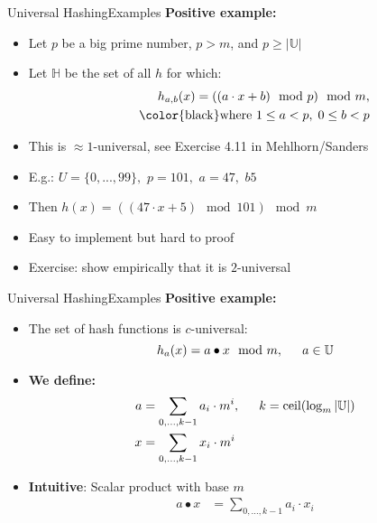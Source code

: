 \begin{frame}{Universal Hashing}{Examples}
  \textbf{Positive example:}
  \begin{itemize}
    \item<1->
      Let {\color{Mittel-Blau}$p$} be a big prime number, {\color{Mittel-Blau}$p > m$}, and {\color{Mittel-Blau}$p \geq \vert \mathbb{U} \vert$}
    \item<2->
      Let {\color{Mittel-Blau}$\mathbb{H}$} be the set of all {\color{Mittel-Blau}$h$} for which:
      {\color{Mittel-Blau}
      \begin{align*}
        h_{a, b}(x) = ((a \cdot x + b) \mod p) \mod m,\\
        \hspace*{1.5em} \text{{\color{black}where }} 1 \leq a < p, \; 0 \leq b < p
      \end{align*}}
    \item<3-> This is {\color{Mittel-Blau}$\approx1$-universal}, see {\color{teal}Exercise 4.11} in Mehlhorn/Sanders
    \item<4-> E.g.: {\color{Mittel-Blau}$U=\{0,...,99\},$ \hspace{0.5em} $p=101,$ \hspace{0.5em} $a=47,$ $b5$}
   \item<5-> Then {\color{Mittel-Blau}$h(x) = ((47 \cdot x + 5) \mod 101) \mod m$}
   \item<6-> Easy to implement but hard to proof
   \item<7-> Exercise: show empirically that it is {\color{Mittel-Blau}$2$}-universal
  \end{itemize}
\end{frame}


\begin{frame}{Universal Hashing}{Examples}
  \textbf{Positive example:}
  \begin{itemize}
    \item<1->
      The set of hash functions is {\color{Mittel-Blau}$c$}-universal:
      {\color{Mittel-Blau}
      \[h_{a}(x) = a \bullet x \mod m, \hspace*{1.5em} a \in \mathbb{U}\]}
    \item<2->
      \textbf{We define:}
      {\color{Mittel-Blau}
      \begin{align*}
        a &= \sum_{0, \ldots, k-1} a_i \cdot m^i,
        \hspace*{1.5em} k = \mathrm{ceil}(\log_m \vert \mathbb{U} \vert)\\
        x &= \sum_{0, \ldots, k-1} x_i \cdot m^i
      \end{align*}}
    \item<3->
      \textbf{Intuitive}: Scalar product with base {\color{Mittel-Blau}$m$}
      {\color{Mittel-Blau}
      \begin{align*}
        a \bullet x &= \sum_{0, \ldots, k-1} a_i \cdot x_i
      \end{align*}}
  \end{itemize}
\end{frame}

